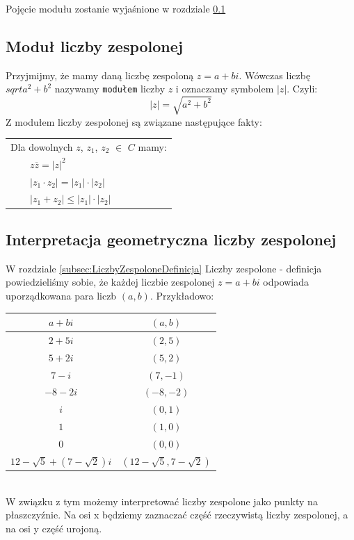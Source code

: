 \documentclass[a4paper,12pt]{article}
\begin{document}
Pojęcie modułu zostanie wyjaśnione w rozdziale \ref{subsec:ModulLiczbyZespolonej}
\cite{matemaks2}

\subsection{Moduł liczby zespolonej}
\label{subsec:ModulLiczbyZespolonej}
Przyjmijmy, że mamy daną liczbę zespoloną $z=a+bi$.
Wówczas liczbę $sqrt{a^{2}+b^{2}}$ nazywamy \texttt{modułem} liczby $z$ i oznaczamy symbolem $|z|$.
Czyli:
\begin{equation}
|z|=\sqrt{a^{2}+b^{2}}
\label{eq:4}
\end{equation}
Z modułem liczby zespolonej są związane następujące fakty:
\\[0.6 cm]
\begin{tabular}{|l|} \hline
Dla dowolnych $z$, $z_{1}$, $z_{2}$ $\in$ $C$ mamy: \\
~~~~$z\overline{z}=|z|^{2}$ \\
~~~~$|z_{1}\cdot z_{2}|=|z_{1}|\cdot|z_{2}|$ \\
~~~~$|z_{1}+z_{2}|\leq|z_{1}|\cdot|z_{2}|$ \\ \hline
\end{tabular}
\cite{matemaks3}

\subsection{Interpretacja geometryczna liczby zespolonej}
\label{subsec:InterpretacjaGeometrycznaLiczbyZespolonej}
W rozdziale \ref{subsec:LiczbyZespoloneDefinicja} Liczby zespolone - definicja powiedzieliśmy sobie, że każdej liczbie zespolonej $z=a+bi$ odpowiada uporządkowana para liczb $(a, b)$. Przykładowo:
\\[1.1 cm]
\begin{tabular}{|c|c|} \hline
$a+bi$ & $(a,b)$ \\ \hline
$2+5i$ & $(2,5)$ \\ \hline
$5+2i$ & $(5,2)$ \\ \hline
$7-i$ & $(7,-1)$ \\ \hline
$-8-2i$ & $(-8,-2)$ \\ \hline
$i$ & $(0,1)$ \\ \hline
$1$ & $(1,0)$ \\ \hline
$0$ & $(0,0)$ \\ \hline
$12-\sqrt{5}+(7-\sqrt{2})i$ & $(12-\sqrt{5},7-\sqrt{2})$ \\ \hline
\end{tabular}
\\[1.1 cm]
W związku z tym możemy interpretować liczby zespolone jako punkty na płaszczyźnie.
Na osi x będziemy zaznaczać część rzeczywistą liczby zespolonej, a na osi y część urojoną.
\end{document}
